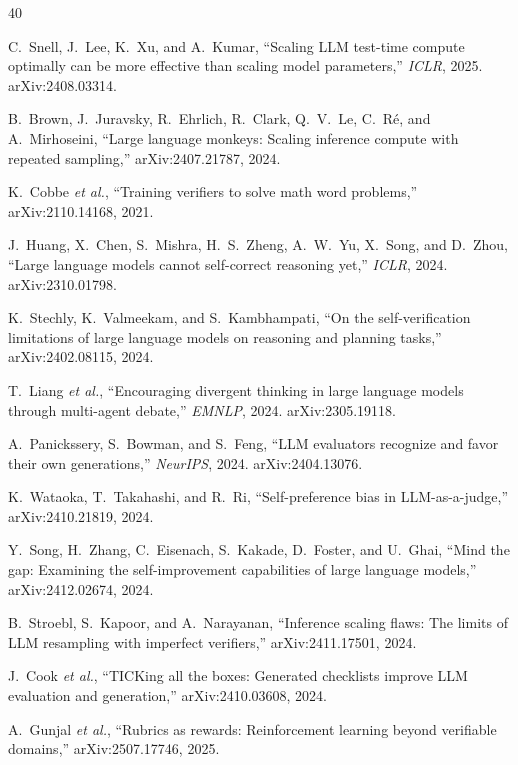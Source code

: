 \documentclass[journal]{IEEEtran}
\begin{document}
\begin{thebibliography}{40}

 C.~Snell, J.~Lee, K.~Xu, and A.~Kumar, ``Scaling LLM
test-time compute optimally can be more effective than scaling model
parameters,'' \emph{ICLR}, 2025. arXiv:2408.03314.

 B.~Brown, J.~Juravsky, R.~Ehrlich, R.~Clark, Q.~V.~Le,
C.~R\'e, and A.~Mirhoseini, ``Large language monkeys: Scaling inference
compute with repeated sampling,'' arXiv:2407.21787, 2024.

 K.~Cobbe \emph{et al.}, ``Training verifiers to solve
math word problems,'' arXiv:2110.14168, 2021.

 J.~Huang, X.~Chen, S.~Mishra, H.~S.~Zheng, A.~W.~Yu,
X.~Song, and D.~Zhou, ``Large language models cannot self-correct reasoning
yet,'' \emph{ICLR}, 2024. arXiv:2310.01798.

 K.~Stechly, K.~Valmeekam, and S.~Kambhampati, ``On the
self-verification limitations of large language models on reasoning and
planning tasks,'' arXiv:2402.08115, 2024.

 T.~Liang \emph{et al.}, ``Encouraging divergent thinking
in large language models through multi-agent debate,'' \emph{EMNLP}, 2024.
arXiv:2305.19118.

 A.~Panickssery, S.~Bowman, and S.~Feng, ``LLM
evaluators recognize and favor their own generations,'' \emph{NeurIPS},
2024. arXiv:2404.13076.

 K.~Wataoka, T.~Takahashi, and R.~Ri,
``Self-preference bias in LLM-as-a-judge,'' arXiv:2410.21819, 2024.

 Y.~Song, H.~Zhang, C.~Eisenach, S.~Kakade, D.~Foster, and
U.~Ghai, ``Mind the gap: Examining the self-improvement capabilities of
large language models,'' arXiv:2412.02674, 2024.

 B.~Stroebl, S.~Kapoor, and A.~Narayanan, ``Inference
scaling flaws: The limits of LLM resampling with imperfect verifiers,''
arXiv:2411.17501, 2024.

 J.~Cook \emph{et al.}, ``TICKing all the boxes:
Generated checklists improve LLM evaluation and generation,''
arXiv:2410.03608, 2024.

 A.~Gunjal \emph{et al.}, ``Rubrics as rewards: Reinforcement
learning beyond verifiable domains,'' arXiv:2507.17746, 2025.


\end{thebibliography}
\end{document}
